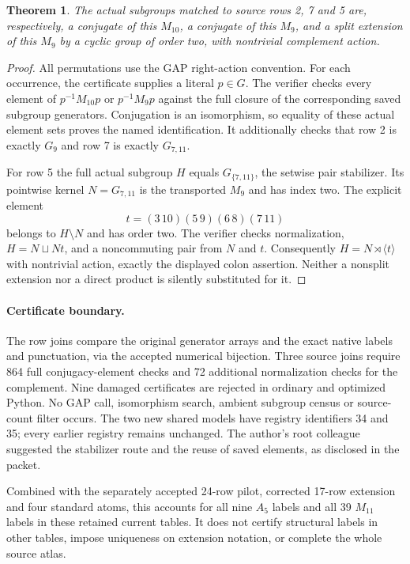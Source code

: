 \documentclass[11pt]{article}
\newtheorem{theorem}{Theorem}
\begin{document}
\begin{theorem}
The actual subgroups matched to source rows 2, 7 and 5 are, respectively,
a conjugate of this $M_{10}$, a conjugate of this $M_9$, and a split extension
of this $M_9$ by a cyclic group of order two, with nontrivial complement action.
\end{theorem}
\begin{proof}
All permutations use the GAP right-action convention. For each occurrence,
the certificate supplies a literal $p\in G$. The verifier checks every element
of $p^{-1}M_{10}p$ or $p^{-1}M_9p$ against the full closure of the corresponding
saved subgroup generators. Conjugation is an isomorphism, so equality of
these actual element sets proves the named identification. It additionally
checks that row 2 is exactly $G_9$ and row 7 is exactly $G_{7,11}$.

For row 5 the full actual subgroup $H$ equals
$G_{\{7,11\}}$, the setwise pair stabilizer. Its pointwise kernel
$N=G_{7,11}$ is the transported $M_9$ and has index two. The explicit element
\[
 t=(3\,10)(5\,9)(6\,8)(7\,11)
\]
belongs to $H\setminus N$ and has order two. The verifier checks normalization,
$H=N\sqcup Nt$, and a noncommuting pair from $N$ and $t$. Consequently
$H=N\rtimes\langle t\rangle$ with nontrivial action, exactly the displayed
colon assertion. Neither a nonsplit extension nor a direct product is silently
substituted for it.
\end{proof}

\paragraph{Certificate boundary.}
The row joins compare the original generator arrays and the exact native
labels and punctuation, via the accepted numerical bijection. Three source
joins require 864 full conjugacy-element checks and 72 additional
normalization checks for the complement. Nine damaged certificates are
rejected in ordinary and optimized Python. No GAP call, isomorphism search,
ambient subgroup census or source-count filter occurs. The two new shared
models have registry identifiers 34 and 35; every earlier registry remains
unchanged. The author's root colleague suggested the stabilizer route and
the reuse of saved elements, as disclosed in the packet.

Combined with the separately accepted 24-row pilot, corrected 17-row extension
and four standard atoms, this accounts for all nine $A_5$ labels and all
39 $M_{11}$ labels in these retained current tables. It does not certify
structural labels in other tables, impose uniqueness on extension notation,
or complete the whole source atlas.
\end{document}
